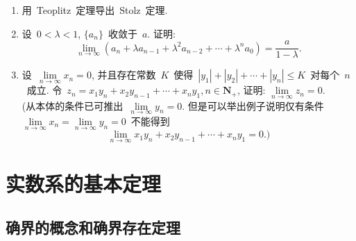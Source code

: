 \documentclass[UTF8,a4paper,11pt,twoside]{book}
\begin{document}
\begin{enumerate}
	\item 用~Teoplitz~定理导出~Stolz~定理.

	\item 设~$0<\lambda<1$, $\{a_n\}$~收敛于~$a$. 证明:
	      \[
		      \lim\limits_{n\to\infty} (a_n+\lambda a_{n-1}+\lambda^2 a_{n-2}+\cdots+\lambda^n a_0)=\dfrac{a}{1-\lambda}.
	      \]

	\item 设~$\lim\limits_{n\to\infty} x_n=0$, 并且存在常数~$K$~使得~$|y_1|+|y_2|+\cdots+|y_n|\leqslant K$~对每个~$n$~成立. 令~$z_n=x_1y_n+x_2y_{n-1}+\cdots+x_ny_1, n\in\mathbf{N}_{+}$, 证明: $\lim\limits_{n\to\infty} z_n=0$.\\
	      (从本体的条件已可推出~$\lim\limits_{n\to\infty} y_n=0$. 但是可以举出例子说明仅有条件~$\lim\limits_{n\to\infty} x_n=\lim\limits_{n\to\infty} y_n=0$~不能得到
	      \[
		      \lim\limits_{n\to\infty} x_1y_n+x_2y_{n-1}+\cdots+x_ny_1=0.\text{)}
	      \]
\end{enumerate}

\chapter{实数系的基本定理}
\section{确界的概念和确界存在定理}
\end{document}
